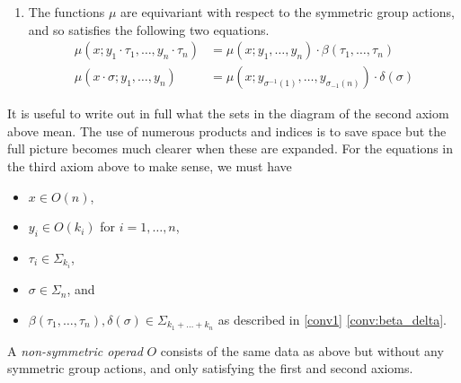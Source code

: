 \begin{Defi}
\begin{enumerate}
  \[
    \xy
      (0,0)*+{\scriptstyle O(n) \times \left(\prod_{i=1}^n O(k_i)\right) \times \left(\prod_{i=1}^n\prod_{j=1}^{k_i} O(l_{i,j})\right)}="a";
      (65,0)*+{\scriptstyle O(n) \times \prod_{i=1}^n \left(O(k_i) \times \prod_{j=1}^{k_i} O(l_{i,j})\right)}="b";
      (65,-20)*+{\scriptstyle O(n) \times \prod_{i=1}^n O\left(\sum_{j=1}^{k_i} l_{i,j}\right)}="c";
      (65,-40)*+{\scriptstyle O\left(\sum_{i=1}^n \sum_{j=1}^{k_i} l_{i,j}\right)}="d";
      (0,-40)*+{\scriptstyle O\left(\sum_{i=1}^n k_i\right) \times \prod_{i=1}^n \prod_{j=1}^{k_i} O(l_{i,j})}="e";
      {\ar^{\cong} "a" ; "b"};
      {\ar^{1 \times \prod \mu} "b" ; "c"};
      {\ar^{\mu} "c" ; "d"};
      {\ar_{\mu \times 1} "a" ; "e"};
      {\ar_{\mu} "e" ; "d"};
    \endxy
  \]

\item The functions $\mu$ are equivariant with respect to the symmetric group actions, and so satisfies the following two equations.
  \begin{align*}
    \mu(x;y_1 \cdot \tau_1,\ldots,y_n \cdot \tau_n) &= \mu(x;y_1,\ldots,y_n)\cdot \beta(\tau_1,\ldots,\tau_n)\\
    \mu(x \cdot \sigma; y_1, \ldots, y_n) &= \mu\left(x;y_{\sigma^{-1}(1)},\ldots,y_{\sigma_{-1}(n)}\right)\cdot \delta(\sigma)
  \end{align*}
\end{enumerate}
\end{Defi}

\begin{rem}\label{Rem:sigma_conditions}
It is useful to write out in full what the sets in the diagram of the second axiom above mean. The use of numerous products and indices is to save space but the full picture becomes much clearer when these are expanded. For the equations in the third axiom above to make sense, we must have
\begin{itemize}
\item $x \in O(n)$,
\item $y_{i} \in O(k_{i})$ for $i=1, \ldots, n$,
\item $\tau_{i} \in \Sigma_{k_{i}}$,
\item $\sigma \in \Sigma_{n}$, and
\item $\beta(\tau_1,\ldots,\tau_n), \delta(\sigma) \in \Sigma_{k_1 + \ldots + k_n}$ as described in \cref{conv1} \eqref{conv:beta_delta}.
\end{itemize}

\end{rem}
\begin{Defi}
A \emph{non-symmetric operad} $O$ consists of the same data as above but without any symmetric group actions, and only satisfying the first and second axioms.
\end{Defi}

